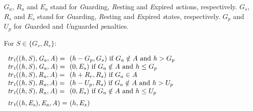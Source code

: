 \begin{example}
  $G_a$, $R_a$ and
  $E_a$ stand for \emph{G}uarding, \emph{R}esting and \emph{E}xpired
  \emph{a}ctions, respectively. %
  $G_s$, $R_s$ and
  $E_s$ stand for \emph{G}uarding, \emph{R}esting and \emph{E}xpired
  \emph{s}tates, respectively.
  $G_p$ and
  $U_p$ for \emph{G}uarded and \emph{U}nguarded \emph{p}enalties.


  For $S \in \{G_s,R_s\}$:
  
  $
  \begin{array}{l@{~}l}

    \tr{t}((h,S), G_a, A) = & (h - G_p, G_s) \text{ if }G_a\notin A \text{ and } h > G_p\\
    \tr{t}((h,S), G_a, A) = & (0, E_s) \text{ if }G_a\notin A \text{ and } h \leq G_p\\
    \tr{t}((h,S), R_a, A) = & (h + R_r, R_s) \text{ if }G_a\in A\\
    \tr{t}((h,S), R_a, A) = & (h - U_p, R_s) \text{ if }G_a\notin A \text{ and } h > U_p\\
    \tr{t}((h,S), R_a, A) = & (0, E_s) \text{ if }G_a\notin A \text{ and } h \leq U_p\\[2mm]


    \tr{t}((h,E_s), E_a, A) = & (h, E_s)\\
\end{array}
  $  
\end{example}

